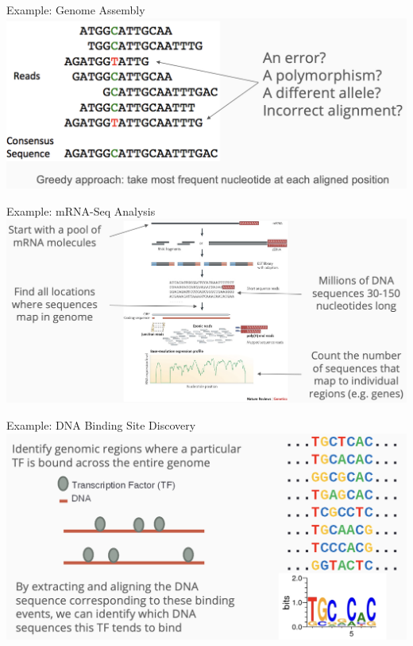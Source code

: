\documentclass[
  ignorenonframetext,
]{beamer}
\begin{document}
\begin{frame}{Example: Genome Assembly}
\label{example-genome-assembly-1}
\includegraphics{figs/assembly2.png}
\end{frame}

\begin{frame}{Example: mRNA-Seq Analysis}
\label{example-mrna-seq-analysis}
\includegraphics{figs/rnaseq_assemble.png}
\end{frame}

\begin{frame}{Example: DNA Binding Site Discovery}
\label{example-dna-binding-site-discovery}
\includegraphics{figs/binding_assemble.png}
\end{frame}
\end{document}
